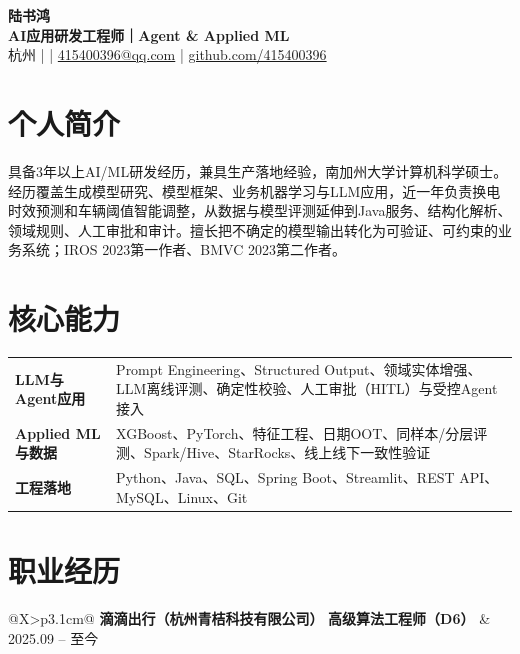 \documentclass[UTF8,fontset=fandol,10pt,a4paper]{ctexart}
\makeatletter
\newcommand{\daterange}[1]{\textcolor{secondary}{\small #1}}
\newcommand{\companyentry}[4]{%
  \begin{tabularx}{\textwidth}{@{}X>{\raggedleft\arraybackslash}p{3.1cm}@{}}
    \textbf{#1} \quad \textbf{#2} & \daterange{#3} \\
    \multicolumn{2}{@{}l@{}}{\textcolor{secondary}{\small #4}}
  \end{tabularx}
}
\makeatother
\begin{document}
\begin{center}
  {\fontsize{22pt}{24pt}\selectfont\bfseries 陆书鸿}\\[0.18em]
  {\large\bfseries\color{primary} AI应用研发工程师｜Agent \& Applied ML}\\[0.32em]
  \small
  杭州
  \quad\textcolor{rulecolor}{|}
  \quad\textcolor{rulecolor}{|}\quad
  \href{mailto:415400396@qq.com}{415400396@qq.com}
  \quad\textcolor{rulecolor}{|}\quad
  \href{https://github.com/415400396}{github.com/415400396}
\end{center}

\vspace{-0.35em}

\section{个人简介}

具备3年以上AI/ML研发经历，兼具生产落地经验，南加州大学计算机科学硕士。经历覆盖生成模型研究、模型框架、业务机器学习与LLM应用，近一年负责换电时效预测和车辆阈值智能调整，从数据与模型评测延伸到Java服务、结构化解析、领域规则、人工审批和审计。擅长把不确定的模型输出转化为可验证、可约束的业务系统；IROS 2023第一作者、BMVC 2023第二作者。

\section{核心能力}

\begin{tabularx}{\textwidth}{@{}>{\bfseries}p{2.45cm}X@{}}
LLM与Agent应用 & Prompt Engineering、Structured Output、领域实体增强、LLM离线评测、确定性校验、人工审批（HITL）与受控Agent接入 \\
Applied ML与数据 & XGBoost、PyTorch、特征工程、日期OOT、同样本/分层评测、Spark/Hive、StarRocks、线上线下一致性验证 \\
工程落地 & Python、Java、SQL、Spring Boot、Streamlit、REST API、MySQL、Linux、Git
\end{tabularx}

\section{职业经历}

\companyentry
  {滴滴出行（杭州青桔科技有限公司）}
  {高级算法工程师（D6）}
  {2025.09 -- 至今}
  {两轮车业务线 · 电单车换电方向 · 用户保障策略组}
\end{document}
